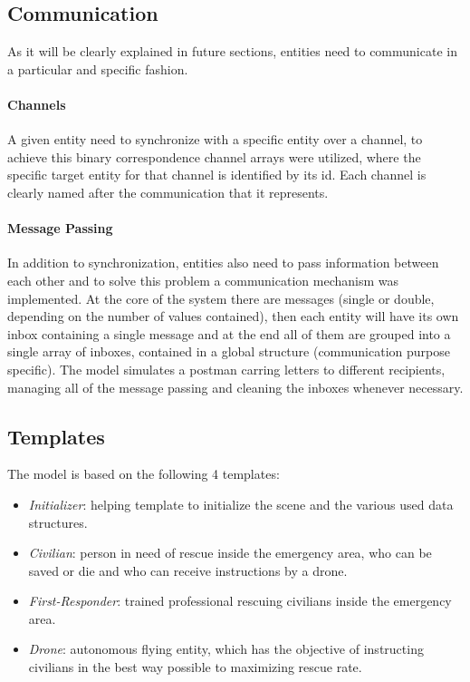 \subsection{Communication}
As it will be clearly explained in future sections, entities need to communicate in a particular and specific fashion.
\paragraph{Channels}
A given entity need to synchronize with a specific entity over a channel, to achieve this binary correspondence channel arrays were utilized, where the specific target entity for that channel is identified by its id. Each channel is clearly named after the communication that it represents.
\paragraph{Message Passing}
In addition to synchronization, entities also need to pass information between each other and to solve this problem a communication mechanism was implemented. At the core of the system there are messages (single or double, depending on the number of values contained), then each entity will have its own inbox containing a single message and at the end all of them are grouped into a single array of inboxes, contained in a global structure (communication purpose specific). The model simulates a postman carring letters to different recipients, managing all of the message passing and cleaning the inboxes whenever necessary.


\subsection{Templates}
The model is based on the following 4 templates:
\begin{itemize}
	\item \textit{Initializer}: helping template to initialize the scene and the various used data structures.
	\item \textit{Civilian}: person in need of rescue inside the emergency area, who can be saved or die and who can receive instructions by a drone.
	\item \textit{First-Responder}: trained professional rescuing civilians inside the emergency area.
	\item \textit{Drone}: autonomous flying entity, which has the objective of instructing civilians in the best way possible to maximizing rescue rate.
\end{itemize}


